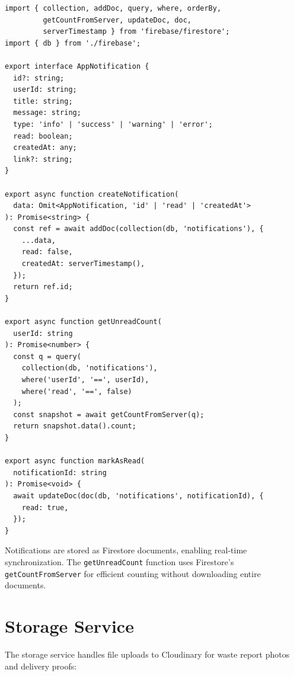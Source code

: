 \documentclass[a4paper,12pt,oneside]{report}
\begin{document}
\begin{lstlisting}[caption={Notification Service (notification-service.ts)}, label={lst:notification}]
import { collection, addDoc, query, where, orderBy, 
         getCountFromServer, updateDoc, doc, 
         serverTimestamp } from 'firebase/firestore';
import { db } from './firebase';

export interface AppNotification {
  id?: string;
  userId: string;
  title: string;
  message: string;
  type: 'info' | 'success' | 'warning' | 'error';
  read: boolean;
  createdAt: any;
  link?: string;
}

export async function createNotification(
  data: Omit<AppNotification, 'id' | 'read' | 'createdAt'>
): Promise<string> {
  const ref = await addDoc(collection(db, 'notifications'), {
    ...data,
    read: false,
    createdAt: serverTimestamp(),
  });
  return ref.id;
}

export async function getUnreadCount(
  userId: string
): Promise<number> {
  const q = query(
    collection(db, 'notifications'),
    where('userId', '==', userId),
    where('read', '==', false)
  );
  const snapshot = await getCountFromServer(q);
  return snapshot.data().count;
}

export async function markAsRead(
  notificationId: string
): Promise<void> {
  await updateDoc(doc(db, 'notifications', notificationId), {
    read: true,
  });
}
\end{lstlisting}

\noindent Notifications are stored as Firestore documents, enabling real-time synchronization. The \texttt{getUnreadCount} function uses Firestore's \texttt{getCountFromServer} for efficient counting without downloading entire documents.

\section{Storage Service}

\noindent The storage service handles file uploads to Cloudinary for waste report photos and delivery proofs:
\end{document}
